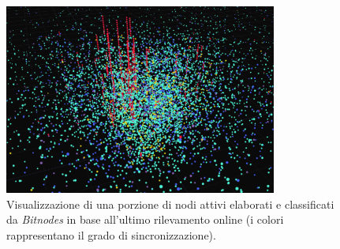\begin{figure}
    \centering
    \includegraphics[width=0.8\textwidth]{images/bitnodes.png}
    \caption{Visualizzazione di una porzione di nodi attivi elaborati e classificati da \textit{Bitnodes} in base all'ultimo rilevamento online (i colori rappresentano il grado di sincronizzazione).}
\end{figure}

